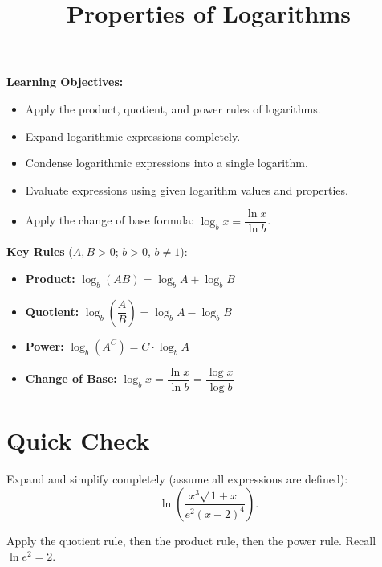 \documentclass{ximera}
\title{Properties of Logarithms}
\begin{document}
\begin{abstract}
\end{abstract}
\maketitle

\textbf{Learning Objectives:}
\begin{itemize}
  \item Apply the product, quotient, and power rules of logarithms.
  \item Expand logarithmic expressions completely.
  \item Condense logarithmic expressions into a single logarithm.
  \item Evaluate expressions using given logarithm values and properties.
  \item Apply the change of base formula: $\log_b x = \dfrac{\ln x}{\ln b}$.
\end{itemize}
\medskip

\noindent\textbf{Key Rules} ($A,B>0$; $b>0$, $b\neq1$):
\begin{itemize}
  \item \textbf{Product:} $\log_b(AB) = \log_b A + \log_b B$
  \item \textbf{Quotient:} $\log_b\!\left(\dfrac{A}{B}\right) = \log_b A - \log_b B$
  \item \textbf{Power:} $\log_b(A^C) = C\cdot\log_b A$
  \item \textbf{Change of Base:} $\log_b x = \dfrac{\ln x}{\ln b} = \dfrac{\log x}{\log b}$
\end{itemize}

\bigskip
\section*{Quick Check}

\begin{problem}
Expand and simplify completely (assume all expressions are defined):
$$\ln\!\left(\frac{x^{3}\sqrt{\,1+x\,}}{e^{2}(x-2)^{4}}\right).$$
\begin{hint}
Apply the quotient rule, then the product rule, then the power rule. Recall $\ln e^2 = 2$.
\end{hint}
\begin{multipleChoice}
\end{multipleChoice}
\end{problem}
\end{document}
